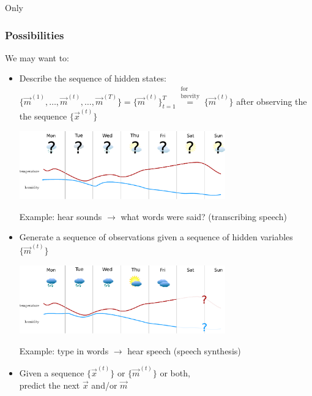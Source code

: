 \newpage

\begin{frame}{Only}
\frametitle{Possibilities}

We may want to:
\begin{itemize}
\item<only@1> Describe the sequence of hidden states:
$\{ \vec m^{(1)}, \ldots, \vec m^{(t)}, \ldots, \vec m^{(T)}\} = \{ \vec m^{(t)}\}_{t=1}^{T} \stackrel{\substack{\text{for}\\ \text{brevity}}}{=} \{ \vec m^{(t)}\}$
after observing the the sequence $\{\vec x^{(t)}\}$\\

\svspace{5mm}

\begin{center}
	\includegraphics[width=0.7\textwidth]{img/weather_est_states}
\end{center}

Example: hear sounds $\rightarrow$ what words were said? (transcribing speech)
\item<only@2> Generate a sequence of observations given a sequence of hidden variables $\{\vec m^{(t)}\}$
\\

\svspace{5mm}

\begin{center}
	\includegraphics[width=0.7\textwidth]{img/weather_est_obs}
\end{center}

Example: type in words $\rightarrow$ hear speech (speech synthesis)
\item<only@3> Given a sequence $\{\vec x^{(t)}\}$ or $\{\vec m^{(t)}\}$ or both,\\
predict the next $\vec x$ and/or $\vec m$


\end{itemize}
\end{frame}

